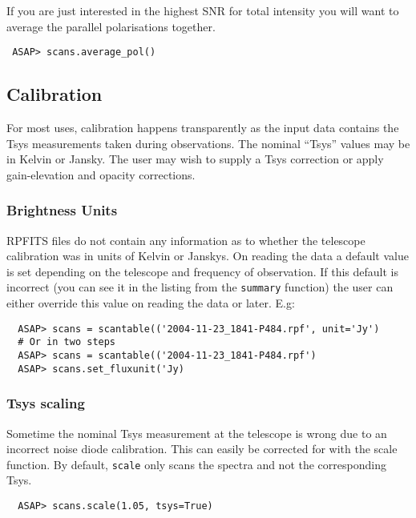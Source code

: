 \documentclass[11pt]{article}
\newcommand{\cmd}[1]{{\tt #1}}
\begin{document}
If you are just interested in the highest SNR for total intensity you
will want to average the parallel polarisations together.

\begin{verbatim}
 ASAP> scans.average_pol()
\end{verbatim}

\subsection{Calibration}

For most uses, calibration happens transparently as the input data
contains the Tsys measurements taken during observations. The nominal
``Tsys'' values may be in Kelvin or Jansky. The user may wish to
supply a Tsys correction or apply gain-elevation and opacity
corrections.

\subsubsection{Brightness Units}

RPFITS files do not contain any information as
to whether the telescope calibration was in units of Kelvin or
Janskys.  On reading the data a default value is set depending on the
telescope and frequency of observation.  If this default is incorrect
(you can see it in the listing from the \cmd{summary} function) the
user can either override this value on reading the data or later.
E.g:

\begin{verbatim}
  ASAP> scans = scantable(('2004-11-23_1841-P484.rpf', unit='Jy')
  # Or in two steps
  ASAP> scans = scantable(('2004-11-23_1841-P484.rpf')
  ASAP> scans.set_fluxunit('Jy)
\end{verbatim}

\subsubsection{Tsys scaling}

Sometime the nominal Tsys measurement at the
telescope is wrong due to an incorrect noise diode calibration. This
can easily be corrected for with the scale function. By default,
\cmd{scale} only scans the spectra and not the corresponding Tsys.

\begin{verbatim}
  ASAP> scans.scale(1.05, tsys=True)
\end{verbatim}
\end{document}
